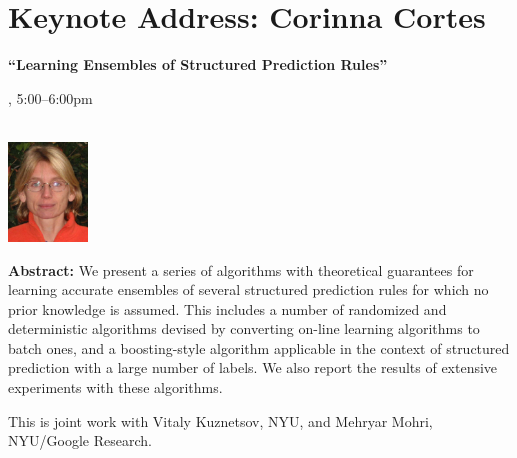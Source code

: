 \section{Keynote Address: Corinna Cortes}

\begin{center}

\begin{Large}
{\bfseries\Large ``Learning Ensembles of Structured Prediction Rules''}\vspace{1em}\par
\end{Large}


\daydateyear, 5:00--6:00pm \vspace{1em}\\
\PlenaryLoc \\
\vspace{1em}\par
\includegraphics[height=100px]{content/monday/cortes-headshot.png}
\end{center}

\noindent
{\bfseries Abstract:} We present a series of algorithms with
theoretical guarantees for learning accurate ensembles of several
structured prediction rules for which no prior knowledge is assumed.
This includes a number of randomized and deterministic algorithms
devised by converting on-line learning algorithms to batch ones, and a
boosting-style algorithm applicable in the context of structured
prediction with a large number of labels. We also report the results
of extensive experiments with these algorithms.

This is joint work with Vitaly Kuznetsov, NYU, and Mehryar Mohri, NYU/Google
Research.

